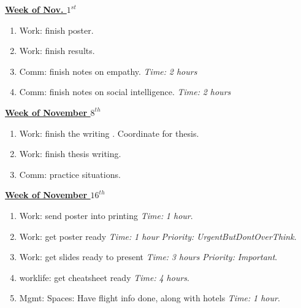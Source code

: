 \documentclass[serif, mathserif, final]{beamer}
\newcommand{\timeEst}[1]{\textit{Time:} \textit{#1}}
\newcommand{\priority}[1]{\textit{Priority:} \textit{#1}}
\begin{document}
{\begin{frame}{}
\begin{columns}
\begin{column}{0.5\linewidth}
\begin{block}{\small \underline{\textbf{Week of Nov. $1^{st}$}}}
\begin{enumerate}
\tiny \item \tiny Work: finish poster. 
\item \tiny Work: finish results. 
\item \tiny Comm: finish notes on empathy. \timeEst{2 hours} 
\item \tiny Comm: finish notes on social intelligence. \timeEst{2 hours} 
\end{enumerate}
\end{block}

\begin{block}{\small \underline{\textbf{Week of November $8^{th}$}}}
\begin{enumerate}
\tiny \item \tiny Work: finish the writing . Coordinate for thesis. 
\item \tiny  Work: finish thesis writing. 
\item \tiny  Comm: practice situations.
\end{enumerate}
\end{block}

\begin{block} {\small \underline{\textbf{Week of November $16^{th}$}} }
\begin{enumerate}
\tiny \item \tiny Work: send poster into printing \timeEst{1 hour}. 
\item \tiny Work: get poster ready \timeEst{1 hour} \priority{UrgentButDontOverThink}. 
\item \tiny Work: get slides ready to present \timeEst{3 hours} \priority{Important}. 
\item \tiny worklife: get cheatsheet ready \timeEst{4 hours}. 
\item \tiny Mgmt: Spaces: Have flight info done, along with hotels \timeEst{1 hour}. 
\end{enumerate}
\end{block} 
\end{column}%


\end{columns}
\end{frame}}
\end{document}
